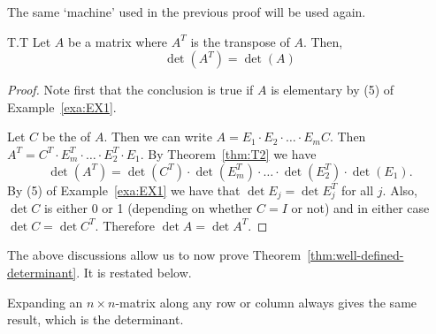 The same `machine' used in the previous proof will be used again. 

\begin{theorem}{}{T.T} 
Let $A$ be a matrix where $A^T$ is the transpose of $A$. Then,
\begin{equation*}
\det(A^T) = \det (A)
\end{equation*}
\end{theorem} 

\begin{proof} 
Note first that the conclusion is true if $A$ is elementary by (5) of Example~\ref{exa:EX1}. 

Let $C$ be the {\rref} of $A$. Then we can write 
$A= E_1\cdot E_2\cdot \dots\cdot E_m C$. 
Then $A^T=C^T\cdot E_m^T\cdot \dots \cdot E_2^T\cdot E_1$. 
By Theorem~\ref{thm:T2} we have 
\[
\det (A^T)=\det (C^T)\cdot \det (E_m^T)\cdot \dots \cdot \det (E_2^T)\cdot \det(E_1).
\] 
By (5) of Example~\ref{exa:EX1} we have that $\det E_j=\det E_j^T$ for all $j$. 
Also, $\det C$ is either 0 or 1 (depending on whether $C=I$ or not) and in either 
case $\det C=\det C^T$. Therefore $\det A=\det A^T$. 
\end{proof} 

The above discussions allow us to now prove Theorem~\ref{thm:well-defined-determinant}. It is restated below. 
 
\begin{theorem}{}{}
Expanding an $n\times n$-matrix along any row or column always gives the same result, which is the determinant. 
\end{theorem} 

